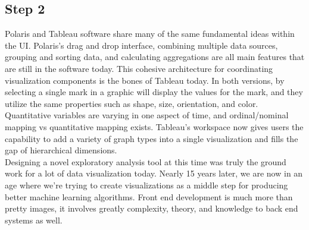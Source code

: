 \documentclass{neu_handout}
\begin{document}
\subsection*{Step 2}

Polaris and Tableau software share many of the same fundamental ideas within the UI. Polaris's drag and drop interface, combining multiple data sources, grouping and sorting data, and calculating aggregations are all main features that are still in the software today. This cohesive architecture for coordinating visualization components is the bones of Tableau today. In both versions, by selecting a single mark in a graphic will display the values for the mark, and they utilize the same properties such as shape, size, orientation, and color. Quantitative variables are varying in one aspect of time, and ordinal/nominal mapping vs quantitative mapping exists. Tableau's workspace now gives users the capability to add a variety of graph types into a single visualization and fills the gap of hierarchical dimensions. \\

Designing a novel exploratory analysis tool at this time was truly the ground work for a lot of data visualization today. Nearly 15 years later, we are now in an age where we're trying to create visualizations as a middle step for producing better machine learning algorithms. Front end development is much more than pretty images, it involves greatly complexity, theory, and knowledge to back end systems as well.
\end{document}

